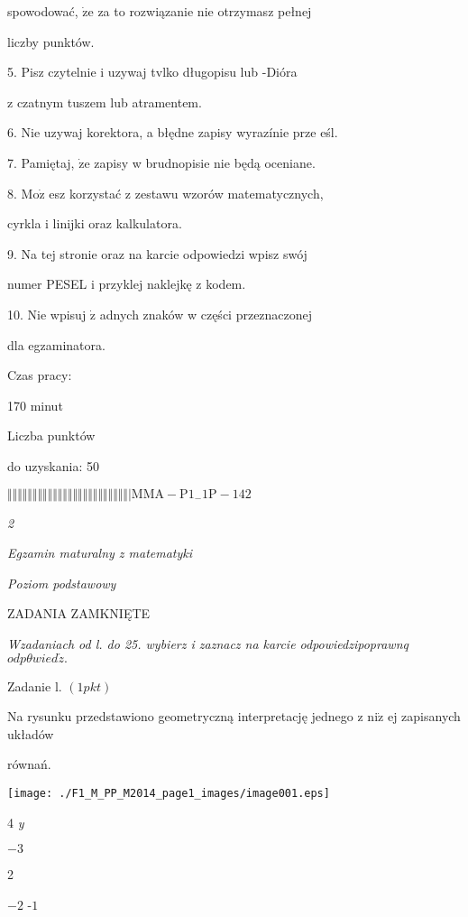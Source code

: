 \documentclass[a4paper,12pt]{article}
\begin{document}
spowodować, $\dot{\mathrm{z}}\mathrm{e}$ za to rozwiązanie nie otrzymasz pełnej

liczby punktów.

5. Pisz czytelnie i uzywaj tvlko długopisu lub -Dióra

z czatnym tuszem lub atramentem.

6. Nie uzywaj korektora, a błędne zapisy wyrazínie prze eśl.

7. Pamiętaj, $\dot{\mathrm{z}}\mathrm{e}$ zapisy w brudnopisie nie będą oceniane.

8. $\mathrm{M}\mathrm{o}\dot{\mathrm{z}}$ esz korzystać z zestawu wzorów matematycznych,

cyrkla i linijki oraz kalkulatora.

9. Na tej stronie oraz na karcie odpowiedzi wpisz swój

numer PESEL i przyklej naklejkę z kodem.

10. Nie wpisuj $\dot{\mathrm{z}}$ adnych znaków w części przeznaczonej

dla egzaminatora.

Czas pracy:

170 minut

Liczba punktów

do uzyskania: 50

$\Vert\Vert\Vert\Vert\Vert\Vert\Vert\Vert\Vert\Vert\Vert\Vert\Vert\Vert\Vert\Vert\Vert\Vert\Vert\Vert\Vert\Vert\Vert\Vert|  \mathrm{M}\mathrm{M}\mathrm{A}-\mathrm{P}1_{-}1\mathrm{P}-142$




{\it 2}

{\it Egzamin maturalny z matematyki}

{\it Poziom podstawowy}

ZADANIA ZAMKNIĘTE

{\it Wzadaniach od l. do 25. wybierz i zaznacz na karcie odpowiedzipoprawnq} $odp\theta wied\acute{z}.$

Zadanie l. $(1pkt)$

Na rysunku przedstawiono geometryczną interpretację jednego z $\mathrm{n}\mathrm{i}\dot{\mathrm{z}}$ ej zapisanych układów

równań.
\begin{center}
\texttt{[image: ./F1\_M\_PP\_M2014\_page1\_images/image001.eps]}
\end{center}
4  {\it y}

$-3$

2

$-2$ -$1$
\end{document}
